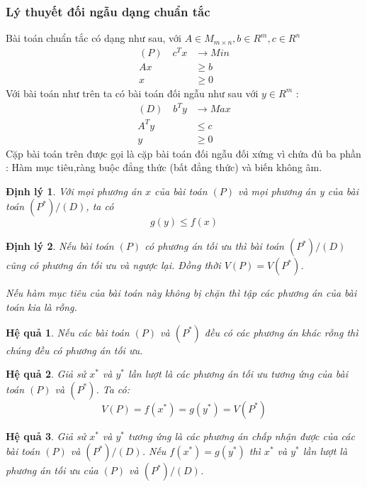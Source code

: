 \documentclass{article}
\newtheorem{dl}{Định lý}
\newtheorem{hq}{Hệ quả}
\begin{document}
\subsubsection{Lý thuyết đối ngẫu dạng chuẩn tắc}
Bài toán chuẩn tắc có dạng như sau,
 với $A \in M_{m \times n},b \in R^m, c \in R^n$ \\ 
\begin{equation*}
    \begin{split}
        (P) \quad c^Tx &\rightarrow Min \\
        Ax &\geq b \\
        x &\geq 0 
    \end{split}
\end{equation*}
Với bài toán như trên ta có bài toán đối ngẫu như sau với $y \in R^m$ : \\
\begin{equation*}
    \begin{split}
        (D) \quad b^Ty &\rightarrow Max \\
        A^Ty &\leq c \\
        y &\geq 0
    \end{split}
\end{equation*}
Cặp bài toán trên được gọi là cặp bài toán đối ngẫu đối xứng vì chứa đủ ba phần : Hàm mục tiêu,ràng buộc đẳng thức (bất đẳng thức) và biến không âm. \\
\begin{dl}
    Với mọi phương án $x$ của bài toán $(P)$ và mọi phương án y của bài toán $(P^*)/(D)$, ta có $$g(y) \leq f(x)$$
\end{dl}
\begin{dl}
    \item Nếu bài toán $(P)$ có phương án tối ưu thì bài toán $(P^*)/(D)$ cũng có phương án tối ưu và ngược lại. Đồng thời $V(P)=V(P^*)$.
    \item Nếu hàm mục tiêu của bài toán này không bị chặn thì tập các phương án của bài toán kia là rỗng.
\end{dl}
\begin{hq}
    Nếu các bài toán $(P)$ và $(P^*)$ đều có các phương án khác rỗng thì chúng đều có phương án tối ưu.
\end{hq}
\begin{hq}
    Giả sử $x^*$ và $y^*$ lần lượt là các phương án tối ưu tương ứng của bài toán $(P)$ và $(P^*)$. Ta có:
   \[V(P)=f(x^*)=g(y^*)=V(P^*)\]
\end{hq}
\begin{hq}
    Giả sử $x^*$ và $y^*$ tương ứng là các phương án chấp nhận được của các bài toán $(P)$ và $(P^*)/(D)$. Nếu $f(x^*)=g(y^*)$ thì $x^*$ và $y^*$ lần lượt là phương án tối ưu của $(P)$ và $(P^*)/(D)$.
\end{hq}
\end{document}
